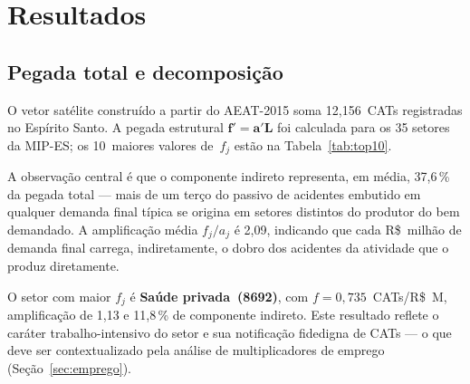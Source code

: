 \documentclass[12pt, a4paper]{article}
\begin{document}
  \section{Resultados}
  \label{sec:resultados}

  \subsection{Pegada total e decomposição}

  O vetor satélite construído a partir do AEAT-2015 soma 12,156~CATs
  registradas no Espírito Santo. A pegada estrutural
  $\mathbf{f}' = \mathbf{a}'\mathbf{L}$ foi calculada para os 35 setores da
  MIP-ES; os 10~maiores valores de~$f_j$ estão na
  Tabela~\ref{tab:top10}.

  A observação central é que o componente indireto representa, em
  média, 37{,}6\,\% da pegada total --- mais de um terço do passivo
  de acidentes embutido em qualquer demanda final típica se origina em
  setores distintos do produtor do bem demandado. A amplificação média
  $f_j/a_j$ é 2{,}09, indicando que cada R\$~milhão de
  demanda final carrega, indiretamente, o dobro dos acidentes da
  atividade que o produz diretamente.

  O setor com maior $f_j$ é \textbf{Saúde privada~(8692)},
  com $f = 0{,}735$~CATs/R\$~M, amplificação
  de 1{,}13 e 11{,}8\,\%
  de componente indireto. Este resultado reflete o caráter
  trabalho-intensivo do setor e sua notificação fidedigna de CATs ---
  o que deve ser contextualizado pela análise de multiplicadores de
  emprego (Seção~\ref{sec:emprego}).
\end{document}
